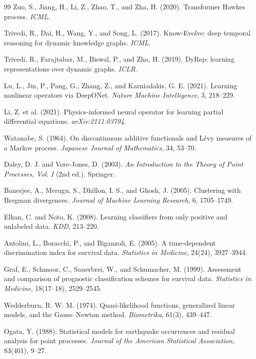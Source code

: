 \documentclass[11pt]{article}
\theoremstyle{plain}
\theoremstyle{definition}
\theoremstyle{remark}
\begin{document}
\begin{thebibliography}{99}
 Zuo, S., Jiang, H., Li, Z., Zhao, T., and Zha, H. (2020). Transformer Hawkes process. \emph{ICML}.

 Trivedi, R., Dai, H., Wang, Y., and Song, L. (2017). Know-Evolve: deep temporal reasoning for dynamic knowledge graphs. \emph{ICML}.

 Trivedi, R., Farajtabar, M., Biswal, P., and Zha, H. (2019). DyRep: learning representations over dynamic graphs. \emph{ICLR}.

 Lu, L., Jin, P., Pang, G., Zhang, Z., and Karniadakis, G. E. (2021). Learning nonlinear operators via DeepONet. \emph{Nature Machine Intelligence}, 3, 218--229.

 Li, Z. et al. (2021). Physics-informed neural operator for learning partial differential equations. \emph{arXiv:2111.03794}.

 Watanabe, S. (1964). On discontinuous additive functionals and L\'evy measures of a Markov process. \emph{Japanese Journal of Mathematics}, 34, 53--70.

 Daley, D. J. and Vere-Jones, D. (2003). \emph{An Introduction to the Theory of Point Processes, Vol. I} (2nd ed.). Springer.

 Banerjee, A., Merugu, S., Dhillon, I. S., and Ghosh, J. (2005). Clustering with Bregman divergences. \emph{Journal of Machine Learning Research}, 6, 1705--1749.

 Elkan, C. and Noto, K. (2008). Learning classifiers from only positive and unlabeled data. \emph{KDD}, 213--220.

 Antolini, L., Boracchi, P., and Biganzoli, E. (2005). A time-dependent discrimination index for survival data. \emph{Statistics in Medicine}, 24(24), 3927--3944.

 Graf, E., Schmoor, C., Sauerbrei, W., and Schumacher, M. (1999). Assessment and comparison of prognostic classification schemes for survival data. \emph{Statistics in Medicine}, 18(17--18), 2529--2545.

 Wedderburn, R. W. M. (1974). Quasi-likelihood functions, generalized linear models, and the Gauss--Newton method. \emph{Biometrika}, 61(3), 439--447.

 Ogata, Y. (1988). Statistical models for earthquake occurrences and residual analysis for point processes. \emph{Journal of the American Statistical Association}, 83(401), 9--27.


\end{thebibliography}
\end{document}
